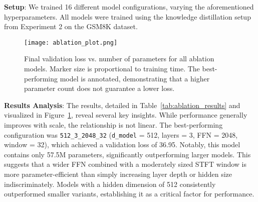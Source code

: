 \documentclass[11pt,a4paper]{article}
\begin{document}
\textbf{Setup}: We trained 16 different model configurations, varying the aforementioned hyperparameters. All models were trained using the knowledge distillation setup from Experiment 2 on the GSM8K dataset.

\begin{figure}[h]
\centering
\texttt{[image: ablation\_plot.png]} %
\caption{Final validation loss vs. number of parameters for all ablation models. Marker size is proportional to training time. The best-performing model is annotated, demonstrating that a higher parameter count does not guarantee a lower loss.}
\label{fig:ablation_plot}
\end{figure}

\textbf{Results Analysis}: The results, detailed in Table~\ref{tab:ablation_results} 
and visualized in Figure~\ref{fig:ablation_plot}, reveal several key insights. 
While performance generally improves with scale, the relationship is not linear. 
The best-performing configuration was \texttt{512\_3\_2048\_32} 
(\texttt{d\_model} = 512, layers = 3, FFN = 2048, window = 32), which 
achieved a validation loss of 36.95. Notably, this model contains only 57.5M 
parameters, significantly outperforming larger models. This suggests that a wider 
FFN combined with a moderately sized STFT window is more parameter-efficient than 
simply increasing layer depth or hidden size indiscriminately. Models with a 
hidden dimension of 512 consistently outperformed smaller variants, establishing it as a critical factor for performance.
\end{document}
